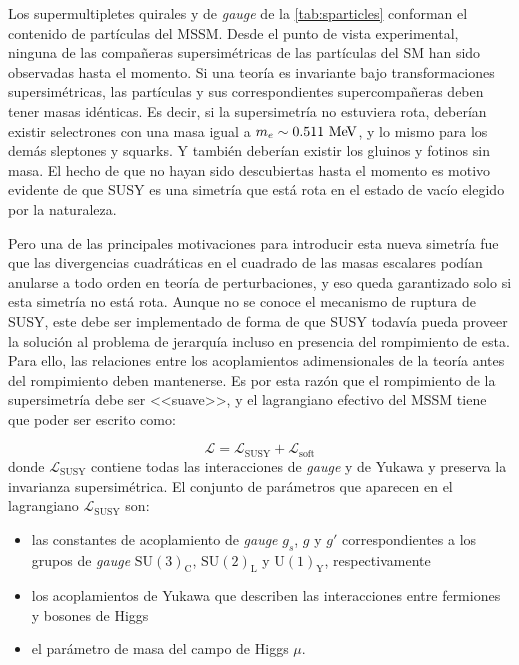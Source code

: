 Los supermultipletes quirales y de \emph{gauge} de la \cref{tab:sparticles} conforman
el contenido de partículas del MSSM. Desde el punto de vista experimental,
ninguna de las compa\~neras supersimétricas de las partículas del SM han sido
observadas hasta el momento.
Si una teoría es invariante bajo transformaciones supersimétricas, las
partículas y sus correspondientes supercompa\~neras deben tener masas idénticas.
Es decir, si la supersimetría no estuviera rota, deberían
existir selectrones con una masa igual a $m_e \sim 0.511 \mev$, y lo mismo para
los demás sleptones y squarks. Y también deberían existir los gluinos y fotinos
sin masa. El hecho de que no hayan sido descubiertas hasta el momento es motivo
evidente de que SUSY es una simetría que está rota en el estado de vacío elegido
por la naturaleza.

Pero una de las principales motivaciones para introducir esta nueva simetría fue
que las divergencias cuadráticas en el cuadrado de las masas escalares podían
anularse a todo orden en teoría de perturbaciones, y eso queda garantizado solo
si esta simetría no está rota. Aunque no se conoce el mecanismo de ruptura de
SUSY, este debe ser implementado de forma de que SUSY todavía pueda proveer la
solución al problema de jerarquía incluso en presencia del rompimiento de esta.
Para ello, las relaciones entre los acoplamientos adimensionales de la
teoría antes del rompimiento deben mantenerse. Es por esta razón que el
rompimiento de la supersimetría debe ser <<suave>>, y
el lagrangiano efectivo del MSSM tiene que poder ser escrito como:

\begin{equation}
  \mathcal{L} = \mathcal{L}_\text{SUSY} + \mathcal{L}_\text{soft}
\end{equation}
%
donde $\mathcal{L}_\text{SUSY}$ contiene todas las interacciones de \emph{gauge} y de
Yukawa y preserva la invarianza supersimétrica.
El conjunto de parámetros que aparecen en el lagrangiano $\mathcal{L}_\text{SUSY}$ son:

\begin{itemize}
\item las constantes de acoplamiento de \emph{gauge} $g_s$, $g$ y $g'$ correspondientes a
  los grupos de \emph{gauge} $\mathrm{SU}(3)_\mathrm{C}$, $\mathrm{SU}(2)_\mathrm{L}$ y $\mathrm{U}(1)_\mathrm{Y}$, respectivamente
\item los acoplamientos de Yukawa que describen las interacciones entre fermiones y bosones de Higgs
\item el parámetro de masa del campo de Higgs $\mu$.
\end{itemize}

